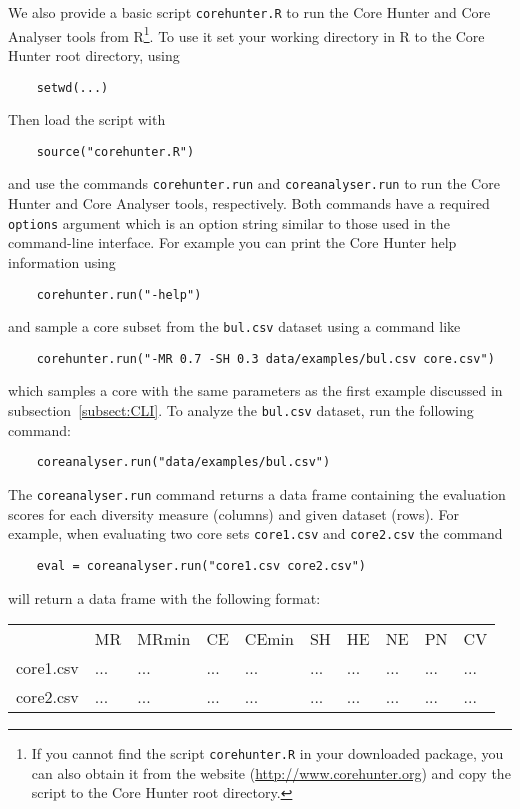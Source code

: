 \documentclass[a4paper, titlepage, 11pt]{article}
\begin{document}
We also provide a basic script \texttt{corehunter.R} to run the Core Hunter and Core Analyser tools from R\footnote{If you cannot find the script \texttt{corehunter.R} in your downloaded package, you can also obtain it from the website (\url{http://www.corehunter.org}) and copy the script to the Core Hunter root directory.}. To use it set your working directory in R to the Core Hunter root directory, using
\begin{verbatim}
    setwd(...)
\end{verbatim}
Then load the script with
\begin{verbatim}
    source("corehunter.R")
\end{verbatim}
and use the commands \texttt{corehunter.run} and \texttt{coreanalyser.run} to run the Core Hunter and Core Analyser tools, respectively. Both commands have a required \texttt{options} argument which is an option string similar to those used in the command-line interface. For example you can print the Core Hunter help information using
\begin{verbatim}
    corehunter.run("-help")
\end{verbatim}
and sample a core subset from the \texttt{bul.csv} dataset using a command like
\begin{verbatim}
    corehunter.run("-MR 0.7 -SH 0.3 data/examples/bul.csv core.csv")
\end{verbatim}
which samples a core with the same parameters as the first example discussed in subsection~\ref{subsect:CLI}. To analyze the \texttt{bul.csv} dataset, run the following command:
\begin{verbatim}
    coreanalyser.run("data/examples/bul.csv")
\end{verbatim}
The \texttt{coreanalyser.run} command returns a data frame containing the evaluation scores for each diversity measure (columns) and given dataset (rows). For example, when evaluating two core sets \texttt{core1.csv} and \texttt{core2.csv} the command
\begin{verbatim}
    eval = coreanalyser.run("core1.csv core2.csv")
\end{verbatim}
will return a data frame with the following format:\\[2ex]
{
\ttfamily
\begin{tabular}{llllllllll}
                   & MR & MRmin & CE & CEmin & SH & HE &NE &PN &CV \\
core1.csv	  &...& ...	& ... & ... & ... & ... & ...	 & ... & ... \\
core2.csv	  &...	& ...	 & ... & ... & ... & ... & ... & ... & ...
\end{tabular}
}
\end{document}
